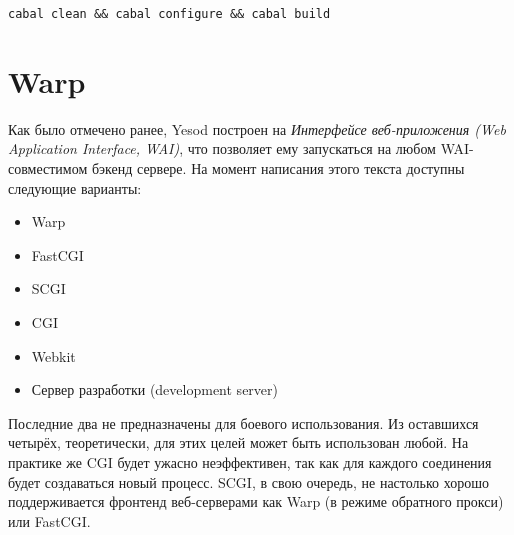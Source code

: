 \begin{lstlisting}
cabal clean && cabal configure && cabal build
\end{lstlisting}

%
\section{Warp}
%
%
%

Как было отмечено ранее, Yesod построен на \emph{Интерфейсе веб-приложения (Web Application Interface, WAI)}, что позволяет ему запускаться на любом WAI-совместимом бэкенд сервере. На момент написания этого текста доступны следующие варианты:
\begin{itemize}
    \item Warp
    \item FastCGI
    \item SCGI
    \item CGI
    \item Webkit
    \item Сервер разработки (development server)
\end{itemize}

%
Последние два не предназначены для боевого %
использования. Из оставшихся четырёх, теоретически, для этих целей может быть использован любой. На практике же CGI будет ужасно неэффективен, так как для каждого соединения будет создаваться новый процесс. SCGI, в свою очередь, не настолько хорошо поддерживается фронтенд веб-серверами как Warp (в режиме обратного прокси) или FastCGI.

